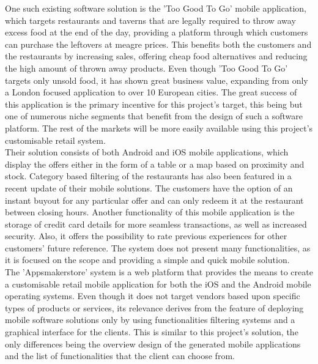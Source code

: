 One such existing software solution is the 'Too Good To Go'\cite{too_good_to_go} mobile application, which targets restaurants and taverns that are legally required to throw away excess food at the end of the day, providing a platform through which customers can purchase the leftovers at meagre prices. This benefits both the customers and the restaurants by increasing sales, offering cheap food alternatives and reducing the high amount of thrown away products. Even though 'Too Good To Go' targets only unsold food, it has shown great business value, expanding from only a London focused application to over 10 European cities. The great success of this application is the primary incentive for this project's target, this being but one of numerous niche segments that benefit from the design of such a software platform. The rest of the markets will be more easily available using this project's customisable retail system.\\

Their solution consists of both Android and iOS mobile applications, which display the offers either in the form of a table or a map based on proximity and stock. Category based filtering of the restaurants has also been featured in a recent update of their mobile solutions. The customers have the option of an instant buyout for any particular offer and can only redeem it at the restaurant between closing hours. Another functionality of this mobile application is the storage of credit card details for more seamless transactions, as well as increased security. Also, it offers the possibility to rate previous experiences for other customers' future reference. The system does not present many functionalities, as it is focused on the scope and providing a simple and quick mobile solution.\\

The 'Appsmakerstore'\cite{appsmakerstore} system is a web platform that provides the means to create a customisable retail mobile application for both the iOS and the Android mobile operating systems. Even though it does not target vendors based upon specific types of products or services, its relevance derives from the feature of deploying mobile software solutions only by using functionalities filtering systems and a graphical interface for the clients. This is similar to this project's solution, the only differences being the overview design of the generated mobile applications and the list of functionalities that the client can choose from.\\

